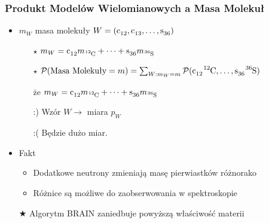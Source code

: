 \documentclass[xetex]{beamer}
\begin{document}
	\begin{frame}\frametitle{{\color{gray}Produkt} Model{\color{gray}ów} Wielomianowy{\color{gray}ch} a Masa Molekuł}
		
		\begin{itemize}
			\item $m_W$ masa molekuły $W = (\cem{c_{12}}, \cem{c_{13}}, \dots, \cem{s_{36}})$ 
			\begin{itemize}
				\item[$\star$] $m_W = \cem{c_{12}} m_\cem{^{12}C} + \dots + \cem{s_{36}} m_\cem{^{36}S}$

				\item[]
				\item[$\star$] $\prob( \text{Masa Molekuły} = m ) = 
					\sum_{W: m_W = m} \prob(
						\cem{c_{12}} \cem{^{12}C}, 
						\dots, 
						\cem{s_{36}} \cem{^{36}S} )$
				\item[że] $m_W = \cem{c_{12}} m_\cem{^{12}C} + \dots + \cem{s_{36}} m_\cem{^{36}S}$
				\item[]
				\item[:)] Wzór $W \rightarrow$ miara $p_W$
				\item[:(] Będzie dużo miar.  
			\end{itemize}
			\item[]
			\item 	Fakt
			\begin{itemize}
				\item 	Dodatkowe neutrony zmieniają masę pierwiastków różnorako   
				\item  	Różnice są możliwe do zaobserwowania w spektroskopie
			\end{itemize}
			\item[$\bigstar$] 	Algorytm BRAIN zaniedbuje powyższą właściwość materii
		\end{itemize}



	\end{frame}
\end{document}
